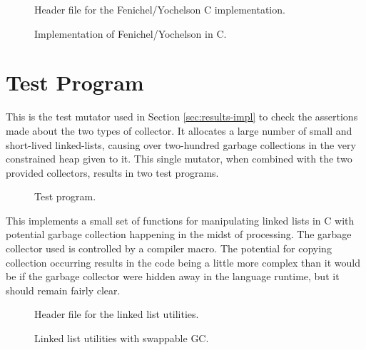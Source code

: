 
\begin{figure}[H]
  \captionsetup{format=default}
  \caption{Header file for the Fenichel/Yochelson C implementation.}
  \label{fig:fenichel-yochelson-h}
\end{figure}


\begin{figure}[H]
  \captionsetup{format=default}
  \caption{Implementation of Fenichel/Yochelson in C.}
  \label{fig:fenichel-yochelson-c}
\end{figure}

\section{Test Program}
\label{sec:gc-impl-test-program}

This is the test mutator used in Section \ref{sec:results-impl} to
check the assertions made about the two types of collector. It
allocates a large number of small and short-lived linked-lists,
causing over two-hundred garbage collections in the very constrained
heap given to it. This single mutator, when combined with the two
provided collectors, results in two test programs.


\begin{figure}[H]
  \captionsetup{format=default}
  \caption{Test program.}
  \label{fig:main-c}
\end{figure}

This implements a small set of functions for manipulating linked lists
in C with potential garbage collection happening in the midst of
processing. The garbage collector used is controlled by a compiler
macro. The potential for copying collection occurring results in the
code being a little more complex than it would be if the garbage
collector were hidden away in the language runtime, but it should
remain fairly clear.


\begin{figure}[H]
  \captionsetup{format=default}
  \caption{Header file for the linked list utilities.}
  \label{fig:lists-h}
\end{figure}


\begin{figure}[H]
  \captionsetup{format=default}
  \caption{Linked list utilities with swappable GC.}
  \label{fig:lists-h}
\end{figure}

